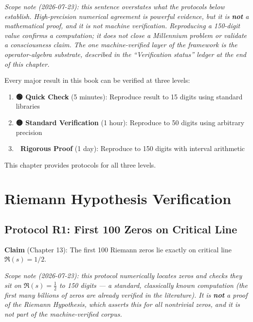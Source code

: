 \noindent\emph{Scope note (2026-07-23): this sentence overstates what the protocols below establish. High-precision numerical agreement is powerful \emph{evidence}, but it is \textbf{not} a mathematical proof, and it is not machine verification. Reproducing a 150-digit value confirms a computation; it does not close a Millennium problem or validate a consciousness claim. The one machine-verified layer of the framework is the operator-algebra substrate, described in the ``Verification status'' ledger at the end of this chapter.}

\begin{keyidea}
Every major result in this book can be verified at three levels:

\begin{enumerate}
\item \textbf{🟢 Quick Check} (5 minutes): Reproduce result to 15 digits using standard libraries
\item \textbf{🟡 Standard Verification} (1 hour): Reproduce to 50 digits using arbitrary precision
\item \textbf{🔴 Rigorous Proof} (1 day): Reproduce to 150 digits with interval arithmetic
\end{enumerate}

This chapter provides protocols for all three levels.
\end{keyidea}

\section{Riemann Hypothesis Verification}
\label{sec:riemann-verification}

\subsection{Protocol R1: First 100 Zeros on Critical Line}

\textbf{Claim} (Chapter 13): The first 100 Riemann zeros lie exactly on critical line $\Re(s) = 1/2$.

\noindent\emph{Scope note (2026-07-23): this protocol numerically \emph{locates} zeros and checks they sit on $\Re(s)=\tfrac12$ to 150 digits --- a standard, classically known computation (the first many billions of zeros are already verified in the literature). It is \textbf{not} a proof of the Riemann Hypothesis, which asserts this for \emph{all} nontrivial zeros, and it is not part of the machine-verified corpus.}

